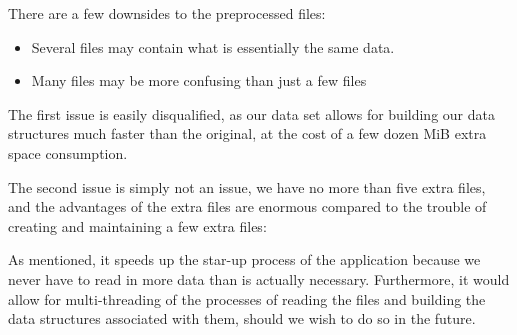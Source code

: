 
There are a few downsides to the preprocessed files:
\begin{itemize}
	\item Several files may contain what is essentially the same data.
	\item Many files may be more confusing than just a few files
\end{itemize}

The first issue is easily disqualified, as our data set allows for building our data structures much faster than the original, at the cost of a few dozen MiB extra space consumption.

The second issue is simply not an issue, we have no more than five extra files, and the advantages of the extra files are enormous compared to the trouble of creating and maintaining a few extra files:

As mentioned, it speeds up the star-up process of the application because we never have to read in more data than is actually necessary. Furthermore, it would allow for multi-threading of the processes of reading the files and building the data structures associated with them, should we wish to do so in the future.
